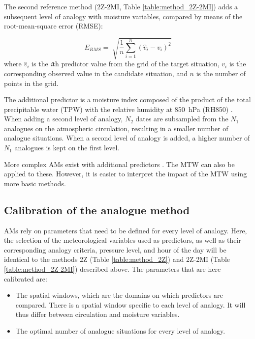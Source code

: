 \documentclass[hess, manuscript]{copernicus}
\begin{document}
	The second reference method (2Z-2MI, Table \ref{table:method_2Z-2MI}) adds a subsequent level of analogy with moisture variables, compared by means of the root-mean-square error (RMSE):
	
	\begin{equation}
	\label{eq:RMSE}
	E_{RMS}= \sqrt[]{ \frac{1}{n} \sum_{i=1}^{n}(\hat{v}_{i} - v_{i})^{2}} 
	\end{equation}
	where $\hat{v}_{i}$ is the \textit{i}th predictor value from the grid of the target situation, $v_{i}$ is the corresponding observed value in the candidate situation, and $n$ is the number of points in the grid.
	
	The additional predictor is a moisture index composed of the product of the total precipitable water (TPW) with the relative humidity at 850~hPa (RH850) \citep{Bontron2004}. When adding a second level of analogy, $N_{2}$ dates are subsampled from the $N_{1}$ analogues on the atmospheric circulation, resulting in a smaller number of analogue situations. When a second level of analogy is added, a higher number of $N_{1}$ analogues is kept on the first level.
	
	More complex AMs exist with additional predictors \citep[see e.g.][]{Horton2012a, BenDaoud2016, Caillouet2016}. The MTW can also be applied to these. However, it is easier to interpret the impact of the MTW using more basic methods.
	
	
	\subsection{Calibration of the analogue method}
	\label{sec:calibration}
	
	AMs rely on parameters that need to be defined for every level of analogy. Here, the selection of the meteorological variables used as predictors, as well as their corresponding analogy criteria, pressure level, and hour of the day will be identical to the methods 2Z (Table \ref{table:method_2Z}) and 2Z-2MI (Table \ref{table:method_2Z-2MI}) described above. The parameters that are here calibrated are:
	
	\begin{itemize}
		\item The spatial windows, which are the domains on which predictors are compared. There is a spatial window specific to each level of analogy. It will thus differ between circulation and moisture variables.
		\item The optimal number of analogue situations for every level of analogy.
	\end{itemize}
	
\end{document}
